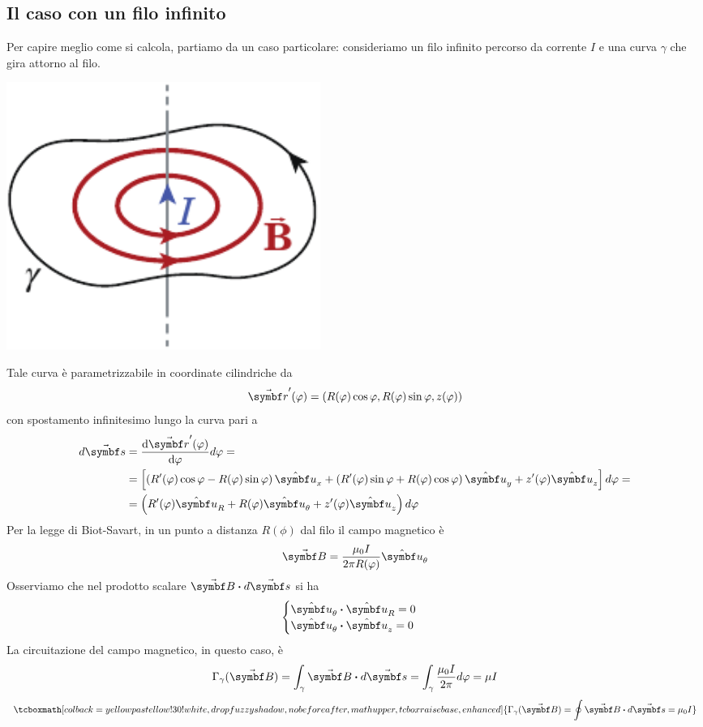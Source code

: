 \subsection{Il caso con un filo infinito}
Per capire meglio come si calcola, partiamo da un caso particolare: consideriamo un filo infinito percorso da corrente $I$ e una curva $\gamma$ che gira attorno al filo.
\begin{center}
	\includegraphics[width=0.45\textwidth]{images/chp9/chp9leggeampere1.pdf}
\end{center}
Tale curva è parametrizzabile in coordinate cilindriche da
\begin{equation*}
	\vba{r}'(\phi)=\left(R(\phi)\cos\phi,R(\phi)\sin\phi,z(\phi)\right)
\end{equation*}
con spostamento infinitesimo lungo la curva pari a
\begin{align*}
	d\vba{s}&=\dv{\vba{r}'(\phi)}{\phi}d\phi=\\
	&=\left[\left(R'(\phi)\cos\phi-R(\phi)\sin\phi\right)\vbh{u}_x+\left(R'(\phi)\sin\phi+R(\phi)\cos\phi\right)\vbh{u}_y+z'(\phi)\vbh{u}_z\right]d\phi=\\
	&=\left(R'(\phi)\vbh{u}_R+R(\phi)\vbh{u}_{\theta}+z'(\phi)\vbh{u}_z\right)d\phi
\end{align*}
Per la legge di Biot-Savart, in un punto a distanza $R(\phi)$ dal filo il campo magnetico è
\begin{equation*}
	\vba{B}=\frac{\mu_0 I}{2\pi R(\phi)}\vbh{u}_{\theta}
\end{equation*}
Osserviamo che nel prodotto scalare $\vba{B}\vdot d\vba{s}$ si ha
\begin{equation*}
	\begin{cases}
		\vbh{u}_\theta\vdot\vbh{u}_R=0\\
		\vbh{u}_\theta\vdot\vbh{u}_z=0
	\end{cases}
\end{equation*}
La circuitazione del campo magnetico, in questo caso, è
\begin{equation*}
	\Gamma_{\gamma}(\vba{B})=\int_{\gamma}\vba{B}\vdot d\vba{s}=\int_{\gamma}\frac{\mu_0 I}{2\pi}d\phi=\mu I
\end{equation*}
\begin{equation}
	\tcboxmath[colback=yellowpastellow!30!white, drop fuzzy shadow, nobeforeafter, math upper, tcbox raise base, enhanced]{\Gamma_{\gamma}(\vba{B})=\oint \vba{B}\vdot d\vba{s}=\mu_0 I}
\end{equation}
